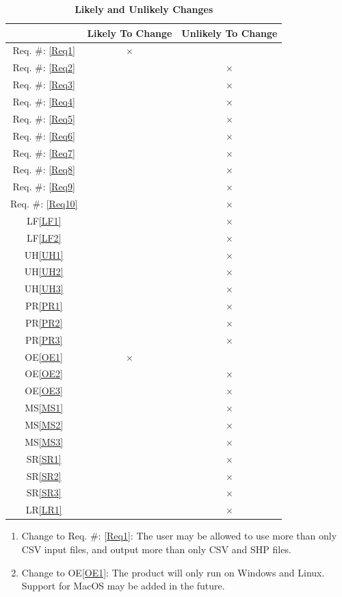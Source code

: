 \documentclass[12pt, titlepage]{article}
\newcommand{\reqref}[1]{Req. \#: \ref{#1}}
\begin{document}
\begin{table}[!h]
\centering
\begin{tabular}{|c|c|c|}
\hline
 & Likely To Change & Unlikely To Change\\
\hline
\reqref{Req1}& $\times$ & \\
\hline
\reqref{Req2}& & $\times$\\
\hline
\reqref{Req3}& & $\times$\\
\hline
\reqref{Req4}& & $\times$\\
\hline
\reqref{Req5}& & $\times$\\
\hline
\reqref{Req6}& & $\times$\\
\hline
\reqref{Req7}& & $\times$\\
\hline
\reqref{Req8}& & $\times$\\
\hline
\reqref{Req9}& & $\times$\\
\hline
\reqref{Req10}& & $\times$\\
\hline
LF\ref{LF1} & & $\times$\\
\hline
LF\ref{LF2}& & $\times$\\
\hline
UH\ref{UH1}& & $\times$\\
\hline
UH\ref{UH2}& & $\times$\\
\hline
UH\ref{UH3}& & $\times$\\
\hline
PR\ref{PR1}& & $\times$\\
\hline
PR\ref{PR2}& & $\times$\\
\hline
PR\ref{PR3}& & $\times$\\
\hline
OE\ref{OE1}& $\times$ & \\
\hline
OE\ref{OE2}& & $\times$\\
\hline
OE\ref{OE3}& & $\times$\\
\hline
MS\ref{MS1}& & $\times$\\
\hline
MS\ref{MS2}& & $\times$\\
\hline
MS\ref{MS3}& & $\times$\\
\hline
SR\ref{SR1}& & $\times$\\
\hline
SR\ref{SR2}& & $\times$\\
\hline
SR\ref{SR3}& & $\times$\\
\hline
LR\ref{LR1}& & $\times$\\
\hline
\end{tabular}
\caption{\bf Likely and Unlikely Changes}
\end{table}

\begin{enumerate}[{LC}1. ]
    \item Change to \reqref{Req1}: The user may be allowed to use more than only CSV input files, and output more than only CSV and SHP files.
    \item Change to OE\ref{OE1}: The product will only run on Windows and Linux. Support for MacOS may be added in the future.
\end{enumerate}
\end{document}

